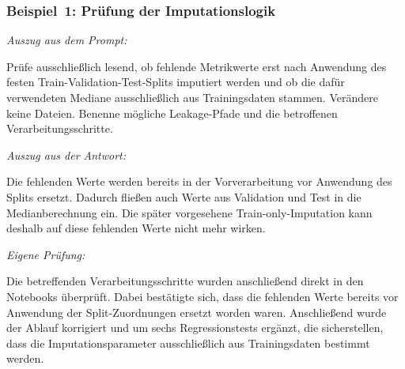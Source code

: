 \newenvironment{kiblock}{%
  \begin{list}{}{%
    \setlength{\leftmargin}{2em}%
    \setlength{\rightmargin}{0pt}%
    \setlength{\topsep}{0.25\baselineskip}%
    \setlength{\partopsep}{0pt}%
    \setlength{\parsep}{0pt}%
    \setlength{\itemsep}{0pt}%
  }%
  \item\relax\noindent\ignorespaces
}{%
  \end{list}%
}

\subsubsection*{Beispiel~1: Prüfung der Imputationslogik}

\noindent\textit{Auszug aus dem Prompt:}\par
\begin{kiblock}
Prüfe ausschließlich lesend, ob fehlende Metrikwerte erst nach Anwendung des
festen Train-\/Validation-\/Test-Splits imputiert werden und ob die dafür
verwendeten Mediane ausschließlich aus Trainingsdaten stammen. Verändere keine
Dateien. Benenne mögliche Leakage-Pfade und die betroffenen
Verarbeitungsschritte.
\end{kiblock}

\noindent\textit{Auszug aus der Antwort:}\par
\begin{kiblock}
Die fehlenden Werte werden bereits in der Vorverarbeitung vor Anwendung des
Splits ersetzt. Dadurch fließen auch Werte aus Validation und Test in die
Medianberechnung ein. Die später vorgesehene Train-only-Imputation kann deshalb
auf diese fehlenden Werte nicht mehr wirken.
\end{kiblock}

\noindent\textit{Eigene Prüfung:}\par
\begin{kiblock}
Die betreffenden Verarbeitungsschritte wurden anschließend direkt in den
Note\-books überprüft. Dabei bestätigte sich, dass die fehlenden Werte bereits vor
Anwendung der Split-Zuordnungen ersetzt worden waren. Anschließend wurde der
Ablauf korrigiert und um sechs Regressionstests ergänzt, die sicherstellen, dass
die Imputationsparameter ausschließlich aus Trainingsdaten bestimmt werden.
\end{kiblock}

